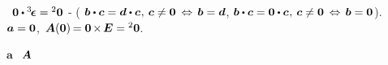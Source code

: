 %
~${\zerovector \dotp \permutationsparitytensor = \zerobivalent}$
\hbox{\hspace{-0.2ex}\inquotes{${\dotp\hspace{.22ex}}$}\hspace{-0.2ex}-}
(%
${\bm{b} \dotp \bm{c} = \bm{d} \dotp \bm{c} \hspace{.1ex} , \hspace{.2em} \bm{c} \neq \zerovector
\hspace{.2em} \Leftrightarrow \hspace{.15em}
\bm{b} = \bm{d} }$,
${\bm{b} \dotp \bm{c} = \zerovector \dotp \bm{c} \hspace{.1ex} , \hspace{.2em} \bm{c} \neq \zerovector
\hspace{.2em} \Leftrightarrow \hspace{.15em}
\bm{b} = \zerovector }$).
~${\bm{a} = {\bm{0}}}$,
${\hspace{.2ex} \bm{A}({\bm{0}}) \hspace{-0.2ex} = {\bm{0}} \hspace{-0.2ex} \times \hspace{-0.2ex} \bm{E} = {^2\bm{0}}}$.

\begin{center}
\pmb{\checkmark} $\bm{a}$  ~${\hspace{-0.2ex}\bm{A}}$
\end{center}

